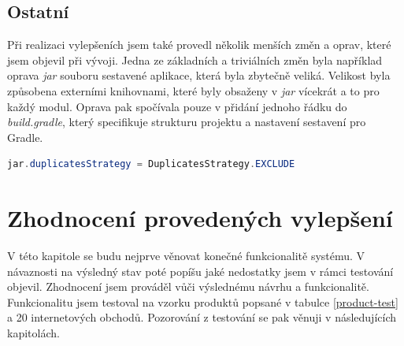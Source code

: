 \documentclass[thesis=B,czech]{FITthesis}[2012/06/26]
\begin{document}
\section{Ostatní}
Při realizaci vylepšeních jsem také provedl několik menších změn a oprav, které jsem objevil při vývoji. Jedna ze základních a triviálních
změn byla například oprava \textit{jar} souboru sestavené aplikace, která byla zbytečně veliká. Velikost byla způsobena externími knihovnami,
které byly obsaženy v \textit{jar} vícekrát a to pro každý modul. Oprava pak spočívala pouze v přidání jednoho řádku
do \textit{build.gradle}, který specifikuje strukturu projektu a nastavení sestavení pro Gradle.
\begin{lstlisting}[language=Java, caption={Nastavení sestavení \textit{jar} souboru, aby neduplikoval knihovny na kterých
					jsou moduly závislé.}]
        jar.duplicatesStrategy = DuplicatesStrategy.EXCLUDE
\end{lstlisting}


\chapter{Zhodnocení provedených vylepšení}
V této kapitole se budu nejprve věnovat konečné funkcionalitě systému. V návaznosti na výsledný stav poté popíšu 
jaké nedostatky jsem v rámci testování objevil. Zhodnocení jsem prováděl vůči výslednému návrhu a funkcionalitě. Funkcionalitu jsem 
testoval na vzorku produktů popsané v tabulce \ref{product-test} a 20 internetových obchodů.
Pozorování z testování se pak věnuji v následujících kapitolách.
\end{document}
